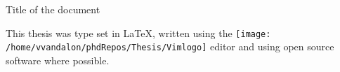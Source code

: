 \begin{titlepage}
   \Huge
   Title of the document
   \vfill
\end{titlepage}

\noindent This thesis was type set in \LaTeX, written using the 
\texttt{[image: /home/vvandalon/phdRepos/Thesis/Vimlogo]}
editor and using open source software where possible.
\tableofcontents
